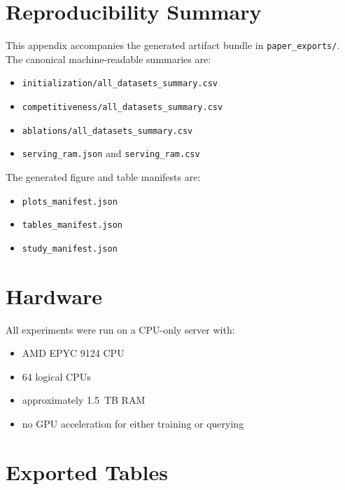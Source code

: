 %

\section{Reproducibility Summary}
\label{sec:appendix:repro}

This appendix accompanies the generated artifact bundle in \texttt{paper\_exports/}.
The canonical machine-readable summaries are:
\begin{itemize}
  \item \texttt{initialization/all\_datasets\_summary.csv}
  \item \texttt{competitiveness/all\_datasets\_summary.csv}
  \item \texttt{ablations/all\_datasets\_summary.csv}
  \item \texttt{serving\_ram.json} and \texttt{serving\_ram.csv}
\end{itemize}

The generated figure and table manifests are:
\begin{itemize}
  \item \texttt{plots\_manifest.json}
  \item \texttt{tables\_manifest.json}
  \item \texttt{study\_manifest.json}
\end{itemize}

\section{Hardware}
\label{sec:appendix:hardware}

All experiments were run on a CPU-only server with:
\begin{itemize}
  \item AMD EPYC 9124 CPU
  \item 64 logical CPUs
  \item approximately 1.5~TB RAM
  \item no GPU acceleration for either training or querying
\end{itemize}

\section{Exported Tables}
\label{sec:appendix:tables}

